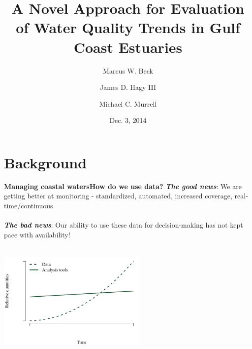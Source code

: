 \documentclass[serif]{beamer}\usepackage[]{graphicx}\usepackage[]{color}
\newcommand{\emtxt}[1]{\textbf{\textit{#1}}}
\begin{document}
\title[Trend Evaluation in Gulf Estuaries]{\textbf{A Novel Approach for Evaluation of Water Quality Trends in Gulf Coast Estuaries}}
\author[Beck, Hagy, Murrell]{Marcus W. Beck \and James D. Hagy III \and Michael C. Murrell}


\date{Dec. 3, 2014}


\begin{frame}[shrink]
\titlepage
\end{frame}

\section{Background}

\begin{frame}{\textbf{Managing coastal waters}}{\textbf{How do we use data?}}
\emtxt{The good news}: We are getting better at monitoring - standardized, automated, increased coverage, real-time/continuous \\~\\
\emtxt{The bad news}: Our ability to use these data for decision-making has not kept pace with availability! \\~\\


{\centering \includegraphics[width=0.55\textwidth]{fig/theo-1} 

}



\end{frame}
\end{document}
